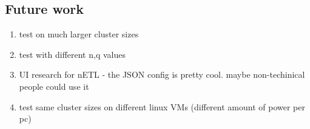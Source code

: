 \subsection{Future work}

\begin{enumerate}
    \item test on much larger cluster sizes
    \item test with different n,q values
    \item UI research for nETL - the JSON config is pretty cool. maybe non-techinical people could use it
    \item test same cluster sizes on different linux VMs (different amount of power per pc)
\end{enumerate}